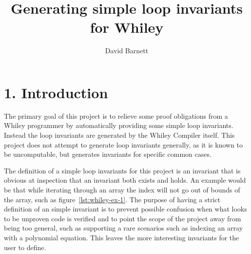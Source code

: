 \documentclass[11pt, a4paper, twoside, openright]{report}
\title{Generating simple loop invariants for Whiley}
\author{David Barnett}
\date{}
\begin{document}
\frontmatter


\begin{abstract}
\end{abstract}


\maketitle


\mainmatter{}

\section*{1. Introduction}

The primary goal of this project is to relieve some proof obligations from a
Whiley programmer by automatically providing some simple loop invariants.
Instead the loop invariants are generated by the Whiley Compiler itself.
This project does not attempt to generate loop invariants generally, as it is
known to be uncomputable, but generates invariants for specific common cases.


The definition of a simple loop invariants for this project is an invariant that is
obvious at inspection that an invariant both exists and holds.
An example would be that while iterating through an array the index
will not go out of bounds of the array, such as figure~\ref{lst:whiley-ex-1}.
The purpose of having a strict definition of an simple invariant is to prevent
possible confusion when what looks to be unproven code is verified and to point
the scope of the project away from being too general, such as supporting
a rare scenarios such as indexing an array with a polynomial equation.
This leaves the more interesting invariants for the user to define.
\end{document}
